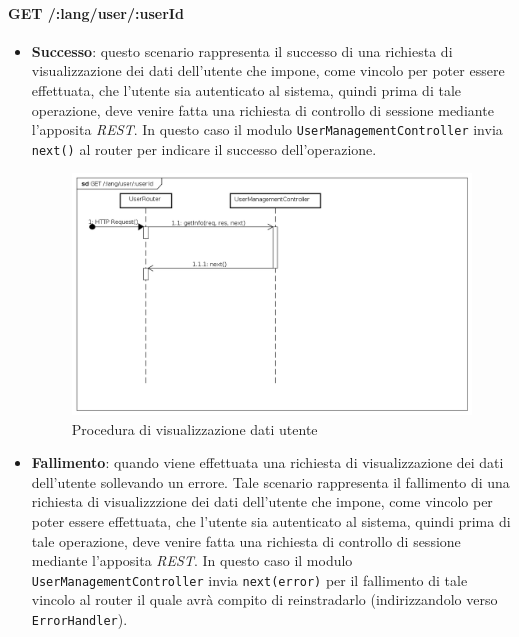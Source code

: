 \paragraph{GET /:lang/user/:userId}
\begin{itemize}
\item \textbf{Successo}: questo scenario rappresenta il successo di una richiesta di visualizzazione dei dati dell'utente che impone, come vincolo per poter essere effettuata, che l'utente sia autenticato al sistema, quindi prima di tale operazione, deve venire fatta una richiesta di controllo di sessione mediante l'apposita \textit{REST}.  
In questo caso il modulo \texttt{UserManagementController} invia \texttt{next()} al router per indicare il successo dell'operazione.

\label{Procedura di visualizzazione dati utente}
\begin{figure}[ht]
	\centering
	\includegraphics[scale=0.40]{UML/DiagrammiDiSequenza/Back-end/GET_LangUserUserIdSuccess.png}
	\caption{Procedura di visualizzazione dati utente}
\end{figure}

\FloatBarrier

\item \textbf{Fallimento}: quando viene effettuata una richiesta di visualizzazione dei dati dell'utente sollevando un errore. Tale scenario rappresenta il fallimento di una richiesta di visualizzzione dei dati dell'utente che impone, come vincolo per poter essere effettuata, che l'utente sia autenticato al sistema, quindi prima di tale operazione, deve venire fatta una richiesta di controllo di sessione mediante l'apposita \textit{REST}. In questo caso il modulo \texttt{UserManagementController} invia \texttt{next(error)} per il fallimento di tale vincolo al router il quale avrà compito di reinstradarlo (indirizzandolo verso \texttt{ErrorHandler}).


\end{itemize}
